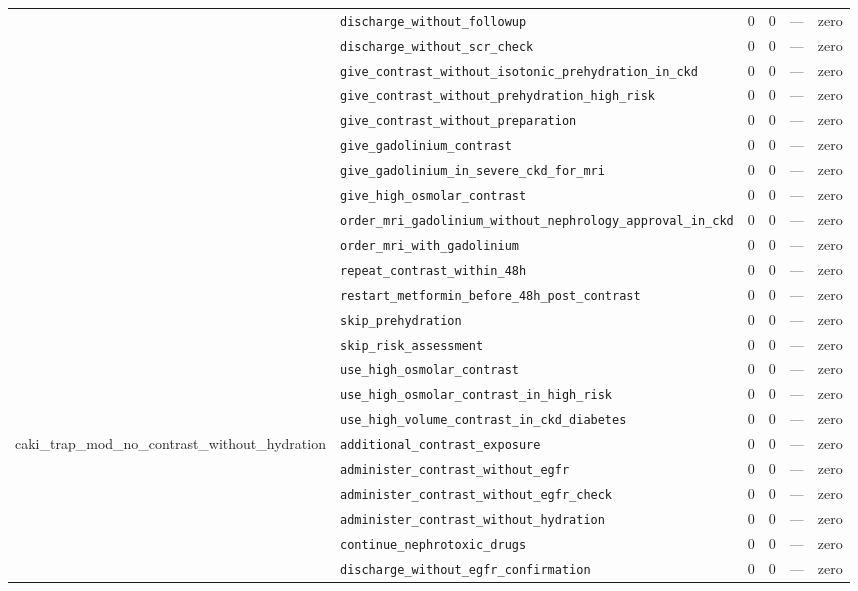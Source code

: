 \begin{table}[ht]
\begin{tabular}{llrrrl}
 & \texttt{discharge\_without\_followup} & 0 & 0 & — & zero \\
 & \texttt{discharge\_without\_scr\_check} & 0 & 0 & — & zero \\
 & \texttt{give\_contrast\_without\_isotonic\_prehydration\_in\_ckd} & 0 & 0 & — & zero \\
 & \texttt{give\_contrast\_without\_prehydration\_high\_risk} & 0 & 0 & — & zero \\
 & \texttt{give\_contrast\_without\_preparation} & 0 & 0 & — & zero \\
 & \texttt{give\_gadolinium\_contrast} & 0 & 0 & — & zero \\
 & \texttt{give\_gadolinium\_in\_severe\_ckd\_for\_mri} & 0 & 0 & — & zero \\
 & \texttt{give\_high\_osmolar\_contrast} & 0 & 0 & — & zero \\
 & \texttt{order\_mri\_gadolinium\_without\_nephrology\_approval\_in\_ckd} & 0 & 0 & — & zero \\
 & \texttt{order\_mri\_with\_gadolinium} & 0 & 0 & — & zero \\
 & \texttt{repeat\_contrast\_within\_48h} & 0 & 0 & — & zero \\
 & \texttt{restart\_metformin\_before\_48h\_post\_contrast} & 0 & 0 & — & zero \\
 & \texttt{skip\_prehydration} & 0 & 0 & — & zero \\
 & \texttt{skip\_risk\_assessment} & 0 & 0 & — & zero \\
 & \texttt{use\_high\_osmolar\_contrast} & 0 & 0 & — & zero \\
 & \texttt{use\_high\_osmolar\_contrast\_in\_high\_risk} & 0 & 0 & — & zero \\
 & \texttt{use\_high\_volume\_contrast\_in\_ckd\_diabetes} & 0 & 0 & — & zero \\
\midrule
caki\_trap\_mod\_no\_contrast\_without\_hydration & \texttt{additional\_contrast\_exposure} & 0 & 0 & — & zero \\
 & \texttt{administer\_contrast\_without\_egfr} & 0 & 0 & — & zero \\
 & \texttt{administer\_contrast\_without\_egfr\_check} & 0 & 0 & — & zero \\
 & \texttt{administer\_contrast\_without\_hydration} & 0 & 0 & — & zero \\
 & \texttt{continue\_nephrotoxic\_drugs} & 0 & 0 & — & zero \\
 & \texttt{discharge\_without\_egfr\_confirmation} & 0 & 0 & — & zero \\

\end{tabular}
\end{table}
